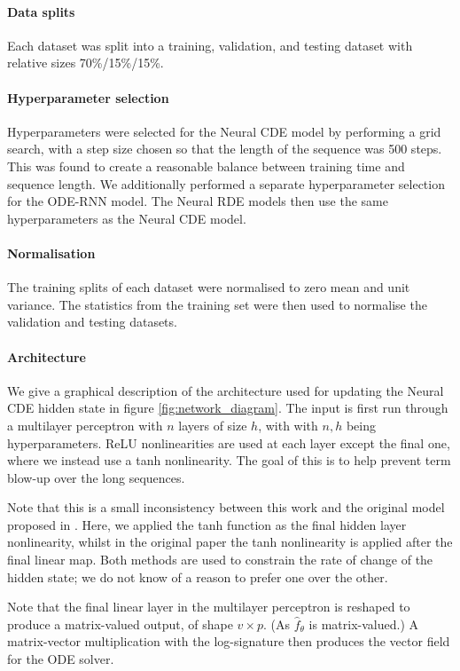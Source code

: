 \documentclass{article}
\begin{document}
\paragraph{Data splits} Each dataset was split into a training, validation, and testing dataset with relative sizes 70\%/15\%/15\%.

\paragraph{Hyperparameter selection} Hyperparameters were selected for the Neural CDE model by performing a grid search, with a step size chosen so that the length of the sequence was 500 steps. This was found to create a reasonable balance between training time and sequence length. We additionally performed a separate hyperparameter selection for the ODE-RNN model. The Neural RDE models then use the same hyperparameters as the Neural CDE model.

\paragraph{Normalisation} The training splits of each dataset were normalised to zero mean and unit variance. The statistics from the training set were then used to normalise the validation and testing datasets.

\paragraph{Architecture} We give a graphical description of the architecture used for updating the Neural CDE hidden state in figure \ref{fig:network_diagram}. The input is first run through a multilayer perceptron with $n$ layers of size $h$, with with $n, h$ being hyperparameters. ReLU nonlinearities are used at each layer except the final one, where we instead use a tanh nonlinearity. The goal of this is to help prevent term blow-up over the long sequences.

Note that this is a small inconsistency between this work and the original model proposed in \citet{kidger2020neural}. Here, we applied the tanh function as the final hidden layer nonlinearity, whilst in the original paper the tanh nonlinearity is applied after the final linear map. Both methods are used to constrain the rate of change of the hidden state; we do not know of a reason to prefer one over the other.

Note that the final linear layer in the multilayer perceptron is reshaped to produce a matrix-valued output, of shape $v \times p$. (As $\widehat{f}_\theta$ is matrix-valued.) A matrix-vector multiplication with the log-signature then produces the vector field for the ODE solver.
\end{document}
